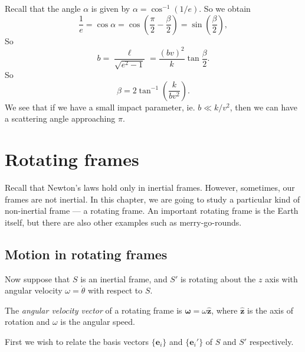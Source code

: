 \documentclass[a4paper]{article}
\begin{document}
Recall that the angle $\alpha$ is given by $\alpha = \cos^{-1} (1/e)$. So we obtain
\[
  \frac{1}{e} = \cos \alpha = \cos \left(\frac{\pi}{2} - \frac{\beta}{2}\right) = \sin\left(\frac{\beta}{2}\right),
\]
So
\[
  b = \frac{\ell}{\sqrt{e^2 - 1}} = \frac{(bv)^2}{k}\tan \frac{\beta}{2}.
\]
So
\[
  \beta = 2\tan^{-1}\left(\frac{k}{bv^2}\right).
\]
We see that if we have a small impact parameter, ie. $b \ll k/v^2$, then we can have a scattering angle approaching $\pi$.

\section{Rotating frames}
Recall that Newton's laws hold only in inertial frames. However, sometimes, our frames are not inertial. In this chapter, we are going to study a particular kind of non-inertial frame --- a rotating frame. An important rotating frame is the Earth itself, but there are also other examples such as merry-go-rounds.

\subsection{Motion in rotating frames}
Now suppose that $S$ is an inertial frame, and $S'$ is rotating about the $z$ axis with angular velocity $\omega = \dot{\theta}$ with respect to $S$.

\begin{defi}
  The \emph{angular velocity vector} of a rotating frame is $\boldsymbol\omega = \omega\hat{\mathbf{z}}$, where $\hat{\mathbf{z}}$ is the axis of rotation and $\omega$ is the angular speed.
\end{defi}

First we wish to relate the basis vectors $\{\mathbf{e}_i\}$ and $\{\mathbf{e}_i'\}$ of $S$ and $S'$ respectively.
\end{document}

